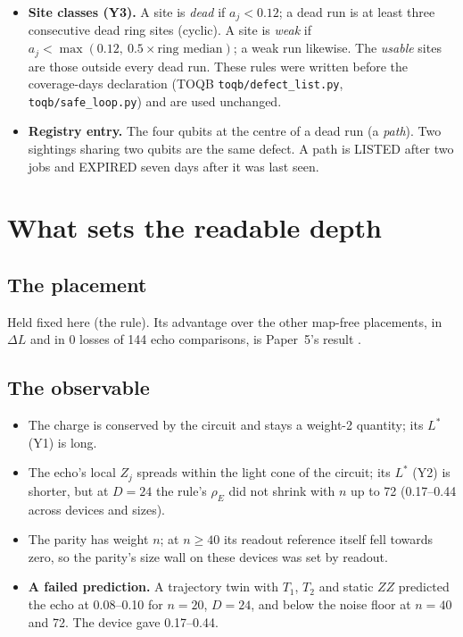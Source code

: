 \documentclass[11pt]{article}
\begin{document}
\begin{itemize}
\item \textbf{Site classes (Y3).} A site is \emph{dead} if $a_j<0.12$; a dead run is at least three consecutive dead
  ring sites (cyclic). A site is \emph{weak} if $a_j<\max(0.12,\ 0.5\times\text{ring median})$; a weak run likewise.
  The \emph{usable} sites are those outside every dead run. These rules were written before the coverage-days
  declaration (TOQB \texttt{toqb/defect\_list.py}, \texttt{toqb/safe\_loop.py}) and are used unchanged.
\item \textbf{Registry entry.} The four qubits at the centre of a dead run (a \emph{path}). Two sightings sharing two
  qubits are the same defect. A path is LISTED after two jobs and EXPIRED seven days after it was last seen.
\end{itemize}

\section{What sets the readable depth}\label{sec:what}

\subsection{The placement}
Held fixed here (the rule). Its advantage over the other map-free placements, in $\Delta L$ and in 0 losses of 144
echo comparisons, is Paper~5's result \cite{paper5}.

\subsection{The observable}
\begin{itemize}
\item The charge is conserved by the circuit and stays a weight-2 quantity; its $L^*$ (Y1) is long.
\item The echo's local $Z_j$ spreads within the light cone of the circuit; its $L^*$ (Y2) is shorter, but at $D=24$ the
  rule's $\rho_E$ did not shrink with $n$ up to 72 (0.17--0.44 across devices and sizes).
\item The parity has weight $n$; at $n\ge40$ its readout reference itself fell towards zero, so the parity's size wall
  on these devices was set by readout.
\item \textbf{A failed prediction.} A trajectory twin with $T_1$, $T_2$ and static $ZZ$ predicted the echo at
  0.08--0.10 for $n=20$, $D=24$, and below the noise floor at $n=40$ and 72. The device gave 0.17--0.44.
\end{itemize}
\end{document}
